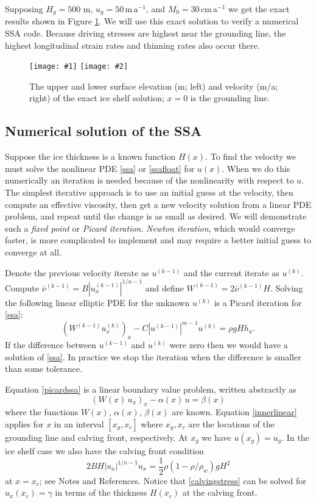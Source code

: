 \documentclass[letterpaper,final,12pt,reqno]{amsart}
\newcommand{\twofigsizes}[5]{
\begin{figure}[ht]
\centering
\texttt{[image: \#1]} \quad
\texttt{[image: \#2]}
\caption{#3}
\label{fig:#1}
\end{figure}}
\newcommand{\twofig}[3]{\twofigsizes{#1}{#2}{#3}{2.5in}{2.5in}}
\begin{document}
Supposing $H_g=500$ m, $u_g = 50 \,\text{m}\,\text{a}^{-1}$, and $M_0=30 \,\text{cm}\,\text{a}^{-1}$ we get the exact results shown in Figure \ref{fig:steadyshelfprofile}.  We will use this exact solution to verify a numerical SSA code.  Because driving stresses are highest near the grounding line, the highest longitudinal strain rates and thinning rates also occur there.

\twofig{steadyshelfprofile}{steadyshelfvelocity}{The upper and lower surface elevation (m; left) and velocity (m/a; right) of the exact ice shelf solution; $x=0$ is the grounding line.}

\subsection*{Numerical solution of the SSA}  Suppose the ice thickness is a known function $H(x)$.  To find the velocity we must solve the nonlinear PDE \eqref{ssa} or \eqref{ssafloat} for $u(x)$.  When we do this numerically an iteration is needed because of the nonlinearity with respect to $u$.  The simplest iterative approach is to use an initial guess at the velocity, then compute an effective viscosity, then get a new velocity solution from a linear PDE problem, and repeat until the change is as small as desired.  We will demonstrate such a \emph{fixed point} or \emph{Picard iteration}.  \emph{Newton iteration}, which would converge faster, is more complicated to implement and may require a better initial guess to converge at all.

Denote the previous velocity iterate as $u^{(k-1)}$ and the current iterate as $u^{(k)}$.  Compute $\bar \nu^{(k-1)} = B |u^{(k-1)}_x|^{1/n-1}$ and define $W^{(k-1)} = 2 \bar \nu^{(k-1)} H$.  Solving the following linear elliptic PDE for the unknown $u^{(k)}$ is a Picard iteration for \eqref{ssa}:
\begin{equation}
   \left(W^{(k-1)} u^{(k)}_x\right)_x - C |u^{(k-1)}|^{m-1} u^{(k)} = \rho g H h_x. \label{picardssa}
\end{equation}
If the difference between $u^{(k-1)}$ and $u^{(k)}$ were zero then we would have a solution of \eqref{ssa}.  In practice we stop the iteration when the difference is smaller than some tolerance.

Equation \eqref{picardssa} is a linear boundary value problem, written abstractly as
\begin{equation}
  \left(W(x)\, u_x\right)_x - \alpha(x)\, u = \beta(x)  \label{innerlinear}
\end{equation}
where the functions $W(x)$, $\alpha(x)$, $\beta(x)$ are known.  Equation \eqref{innerlinear} applies for $x$ in an interval $[x_g,x_c]$ where $x_g,x_c$ are the locations of the grounding line and calving front, respectively.  At $x_g$ we have $u(x_g)=u_g$.  In the ice shelf case we also have the calving front condition
\begin{equation}
  2 B H |u_x|^{1/n - 1} u_x = \frac{1}{2}\rho (1-\rho/\rho_w) g H^2  \label{calvingstress}
\end{equation}
at $x=x_c$; see Notes and References.  Notice that \eqref{calvingstress} can be solved for $u_x(x_c)=\gamma$ in terms of the thickness $H(x_c)$ at the calving front.
\end{document}
